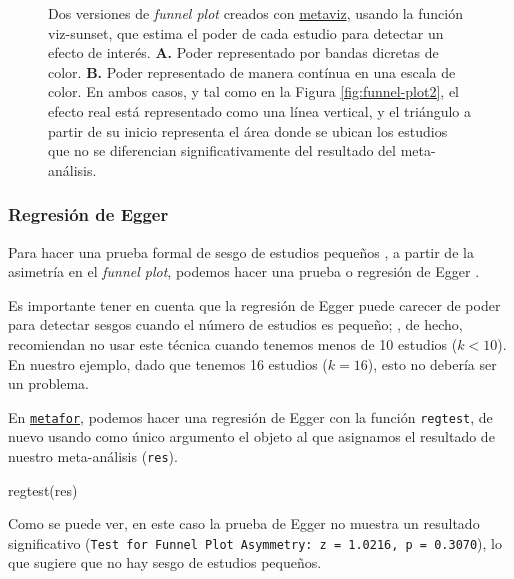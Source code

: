 \documentclass[
  bookmarksnumbered]{article}
\newenvironment{Shaded}{\begin{snugshade}}{\end{snugshade}}
\newcommand{\FunctionTok}[1]{\textcolor[rgb]{0.39,0.29,0.61}{#1}}
\newcommand{\NormalTok}[1]{\textcolor[rgb]{0.12,0.11,0.11}{#1}}
\begin{document}
\begin{figure}
\caption{\label{fig:funnel-plot3}Dos versiones de \emph{funnel plot} creados con \href{https://cran.r-project.org/web/packages/metaviz/vignettes/metaviz.html}{metaviz}, usando la función viz-sunset, que estima el poder de cada estudio para detectar un efecto de interés. \textbf{A.} Poder representado por bandas dicretas de color. \textbf{B.} Poder representado de manera contínua en una escala de color. En ambos casos, y tal como en la Figura \ref{fig:funnel-plot2}, el efecto real está representado como una línea vertical, y el triángulo a partir de su inicio representa el área donde se ubican los estudios que no se diferencian significativamente del resultado del meta-análisis.}
\end{figure}

\hypertarget{reg-egger}{%
\subsubsection{Regresión de Egger}\label{reg-egger}}

Para hacer una prueba formal de sesgo de estudios pequeños \autocite{sternePublicationRelatedBias2000,sterneRecommendationsExaminingInterpreting2011,schwarzerSmallStudyEffectsMetaAnalysis2015}, a partir de la asimetría en el \emph{funnel plot}, podemos hacer una prueba o regresión de Egger \autocite{eggerBiasMetaanalysisDetected1997}.

Es importante tener en cuenta que la regresión de Egger puede carecer de poder para detectar sesgos cuando el número de estudios es pequeño; \textcite{sterneRecommendationsExaminingInterpreting2011}, de hecho, recomiendan no usar este técnica cuando tenemos menos de 10 estudios (\(k < 10\)). En nuestro ejemplo, dado que tenemos 16 estudios (\(k = 16\)), esto no debería ser un problema.

En \href{https://www.metafor-project.org/doku.php}{\texttt{metafor}}, podemos hacer una regresión de Egger con la función \texttt{regtest}, de nuevo usando como único argumento el objeto al que asignamos el resultado de nuestro meta-análisis (\texttt{res}).

\begin{Shaded}
\begin{Highlighting}[]
\FunctionTok{regtest}\NormalTok{(res)}
\end{Highlighting}
\end{Shaded}

Como se puede ver, en este caso la prueba de Egger no muestra un resultado significativo (\texttt{Test\ for\ Funnel\ Plot\ Asymmetry:\ z\ =\ 1.0216,\ p\ =\ 0.3070}), lo que sugiere que no hay sesgo de estudios pequeños.
\end{document}
